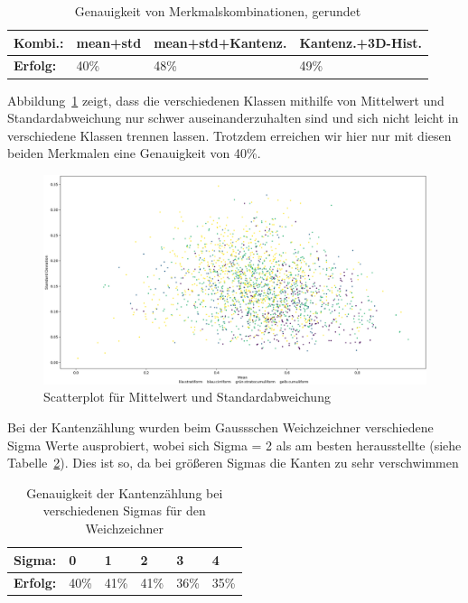 \documentclass[a4,german]{article}
\begin{document}
\begin{table}[h]
\begin{tabular}{|l|l|l|l|}
 \hline
 \textbf{Kombi.:}&mean+std&mean+std+Kantenz.&Kantenz.+3D-Hist.\\
 \hline
 \textbf{Erfolg:} & 40\% & 48\% & 49\% \\
 \hline
\end{tabular}
\caption{Genauigkeit von Merkmalskombinationen, gerundet}
\label{tab:gen2}
\end{table}

Abbildung~\ref{fig:meanstd} zeigt, dass die verschiedenen Klassen mithilfe von Mittelwert und Standardabweichung nur schwer auseinanderzuhalten sind und sich nicht leicht in verschiedene Klassen trennen lassen. Trotzdem erreichen wir hier nur mit diesen beiden Merkmalen eine Genauigkeit von 40\%.
\begin{figure}[h!]
\hspace*{-3cm}
\includegraphics[width=1.5\textwidth]{Scatterplot_mean_std.png}
\caption{Scatterplot für Mittelwert und Standardabweichung}
\label{fig:meanstd}
\end{figure}

Bei der Kantenzählung wurden beim Gaussschen Weichzeichner verschiedene Sigma Werte ausprobiert, wobei sich Sigma = 2 als am besten herausstellte (siehe Tabelle~\ref{tab:sigma}).
Dies ist so, da bei größeren Sigmas die Kanten zu sehr verschwimmen %
\begin{table}[h]
\begin{tabular}{|l|l|l|l|l|l|}
 \hline
 \textbf{Sigma:} & 0 & 1 & 2 & 3 & 4\\
 \hline
 \textbf{Erfolg:} & 40\% & 41\% & 41\% & 36\% & 35\% \\
 \hline
\end{tabular}
\caption{Genauigkeit der Kantenzählung bei verschiedenen Sigmas für den Weichzeichner}
\label{tab:sigma}
\end{table}
\end{document}
